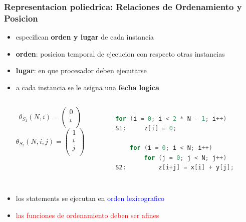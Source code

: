 \documentclass{beamer}\usetheme{Madrid} %
\begin{document}
\begin{frame}[fragile]
\frametitle{Representacion poliedrica: Relaciones de Ordenamiento y Posicion }
\begin{itemize}
\item especifican \textbf{orden y lugar} de cada instancia
\item \textbf{orden}: posicion temporal de ejecucion con respecto
otras instancias
\item \textbf{lugar}: en que procesador deben ejecutarse
\item a cada instancia se le asigna una \textbf{fecha logica}
\begin{columns}
\begin{equation}
\nonumber
\theta_{S_1}(N, i) = \left(\begin{matrix} 0 \\ i\\\end{matrix} \right)
\end{equation}
\begin{equation}
\nonumber
\theta_{S_2}(N, i, j) =  \left(\begin{matrix} 1 \\ i \\ j \\\end{matrix} \right)
\end{equation}
\begin{figure}
\begin{lstlisting}[basicstyle=\scriptsize,language=C]
    for (i = 0; i < 2 * N - 1; i++) 
S1:     z[i] = 0;
        
    for (i = 0; i < N; i++) 
        for (j = 0; j < N; j++)
S2:         z[i+j] = x[i] + y[j];
\end{lstlisting}
\end{figure}
\vfill \null
\end{columns}
\item los statements se ejecutan en \textcolor{blue}{orden lexicografico} 
\item \textcolor{red}{las funciones de ordenamiento deben ser afines}
\end{itemize}
\end{frame}
\end{document}
